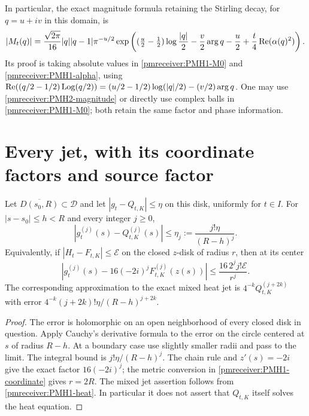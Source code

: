 In particular, the exact magnitude formula retaining the Stirling
decay, for $q=u+iv$ in this domain, is
\begin{equation}\label{pmreceiver:PMH2-magnitude}
 |M_t(q)|=\frac{\sqrt{2\pi}}{16}|q||q-1|\pi^{-u/2}
 \exp\left((\tfrac u2-\tfrac12)\log\frac{|q|}{2}
 -\frac v2\arg q-\frac u2+\frac t4\operatorname{Re}(\alpha(q)^2)\right).
\end{equation}
Its proof is taking absolute values in \eqref{pmreceiver:PMH1-M0} and
\eqref{pmreceiver:PMH1-alpha}, using
$\operatorname{Re}((q/2-1/2)\operatorname{Log}(q/2))=(u/2-1/2)\log(|q|/2)-(v/2)\arg q$.
One may use \eqref{pmreceiver:PMH2-magnitude} or directly use complex balls in
\eqref{pmreceiver:PMH1-M0}; both retain the same factor and phase information.

\section{Every jet, with its coordinate factors and source factor}

\begin{pmreceivertheorem}
\label{pmreceiver:PMH3}
Let $\overline{D(s_0,R)}\subset\mathcal D$ and let
$|g_t-Q_{t,K}|\le\eta$ on this disk, uniformly for $t\in I$.
For $|s-s_0|\le h<R$ and every integer $j\ge0$,
\begin{equation}\label{pmreceiver:PMH3-sjet}
 |g_t^{(j)}(s)-Q_{t,K}^{(j)}(s)|
 \le\eta_j:=\frac{j!\eta}{(R-h)^j}.
\end{equation}
Equivalently, if $|H_t-F_{t,K}|\le\mathcal E$ on the closed
$z$-disk of radius $r$, then at its center
\begin{equation}\label{pmreceiver:PMH3-zjet}
 \left|g_t^{(j)}(s)-16(-2i)^jF_{t,K}^{(j)}(z(s))\right|
 \le\frac{16\,2^j j!\mathcal E}{r^j}.
\end{equation}
The corresponding approximation to the exact mixed heat jet is
$4^{-k}Q_{t,K}^{(j+2k)}$ with error
$4^{-k}(j+2k)!\eta/(R-h)^{j+2k}$.
\end{pmreceivertheorem}
\begin{proof}
The error is holomorphic on an open neighborhood of every closed
disk in question. Apply Cauchy's derivative formula to the error on
the circle centered at $s$ of radius $R-h$. At a boundary case use
slightly smaller radii and pass to the limit. The integral bound is
$j!\eta/(R-h)^j$. The chain rule and
$z'(s)=-2i$ give the exact factor $16(-2i)^j$;
the metric conversion in \eqref{pmreceiver:PMH1-coordinate} gives $r=2R$.
The mixed jet assertion follows from \eqref{pmreceiver:PMH1-heat}.
In particular it does not assert that $Q_{t,K}$ itself solves the
heat equation.
\end{proof}

